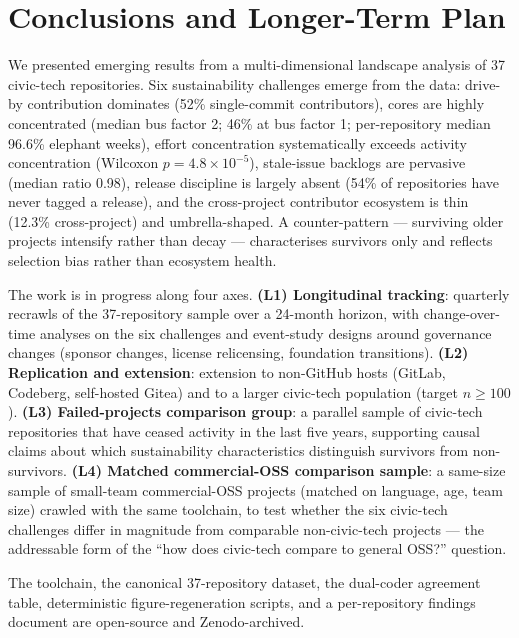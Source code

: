 \documentclass[a4paper,UKenglish,cleveref,autoref,thm-restate]{lipics-v2021}
\begin{document}
\section{Conclusions and Longer-Term Plan}\label{sec:conclusion}

We presented emerging results from a multi-dimensional landscape analysis of 37 civic-tech repositories. Six sustainability challenges emerge from the data: drive-by contribution dominates (52\% single-commit contributors), cores are highly concentrated (median bus factor 2; 46\% at bus factor 1; per-repository median 96.6\% elephant weeks), effort concentration systematically exceeds activity concentration (Wilcoxon $p = 4.8 \times 10^{-5}$), stale-issue backlogs are pervasive (median ratio 0.98), release discipline is largely absent (54\% of repositories have never tagged a release), and the cross-project contributor ecosystem is thin (12.3\% cross-project) and umbrella-shaped. A counter-pattern --- surviving older projects intensify rather than decay --- characterises survivors only and reflects selection bias rather than ecosystem health.

The work is in progress along four axes. \textbf{(L1) Longitudinal tracking}: quarterly recrawls of the 37-repository sample over a 24-month horizon, with change-over-time analyses on the six challenges and event-study designs around governance changes (sponsor changes, license relicensing, foundation transitions). \textbf{(L2) Replication and extension}: extension to non-GitHub hosts (GitLab, Codeberg, self-hosted Gitea) and to a larger civic-tech population (target $n \geq 100$). \textbf{(L3) Failed-projects comparison group}: a parallel sample of civic-tech repositories that have ceased activity in the last five years, supporting causal claims about which sustainability characteristics distinguish survivors from non-survivors. \textbf{(L4) Matched commercial-OSS comparison sample}: a same-size sample of small-team commercial-OSS projects (matched on language, age, team size) crawled with the same toolchain, to test whether the six civic-tech challenges differ in magnitude from comparable non-civic-tech projects --- the addressable form of the ``how does civic-tech compare to general OSS?'' question.

The toolchain, the canonical 37-repository dataset, the dual-coder agreement table, deterministic figure-regeneration scripts, and a per-repository findings document are open-source and Zenodo-archived.
\end{document}
